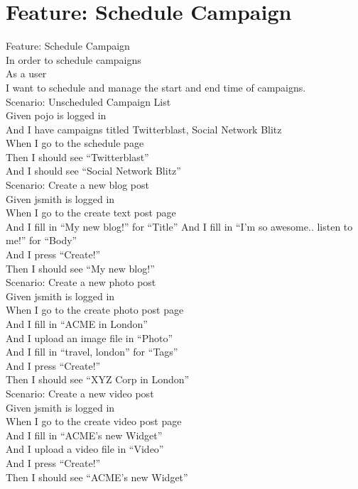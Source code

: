 \documentclass[12pt]{article}
\begin{document}
\section{Feature: Schedule Campaign}

\begin{hangparas}{0.25in}{1}
Feature: Schedule Campaign \\
In order to schedule campaigns \\
As a user \\
I want to schedule and manage the start and end time of campaigns. \\

Scenario: Unscheduled Campaign List \\
  Given pojo is logged in \\
  And I have campaigns titled Twitterblast, Social Network Blitz \\
  When I go to the schedule page \\
  Then I should see ``Twitterblast'' \\
  And I should see ``Social Network Blitz'' \\
  
Scenario: Create a new blog post \\
  Given jsmith is logged in \\
  When I go to the create text post page \\
  And I fill in ``My new blog!'' for ``Title''
  And I fill in ``I'm so awesome.. listen to me!'' for ``Body'' \\
  And I press ``Create!'' \\
  Then I should see ``My new blog!'' \\
  
Scenario: Create a new photo post \\
  Given jsmith is logged in \\
  When I go to the create photo post page \\
  And I fill in ``ACME in London'' \\
  And I upload an image file in ``Photo'' \\
  And I fill in ``travel, london'' for ``Tags'' \\
  And I press ``Create!'' \\
  Then I should see ``XYZ Corp in London'' \\
  
  Scenario: Create a new video post \\
    Given jsmith is logged in \\
    When I go to the create video post page \\
    And I fill in ``ACME's new Widget'' \\
    And I upload a video file in ``Video'' \\
    And I press ``Create!'' \\
    Then I should see ``ACME's new Widget'' \\
  

\end{hangparas}
\end{document}
